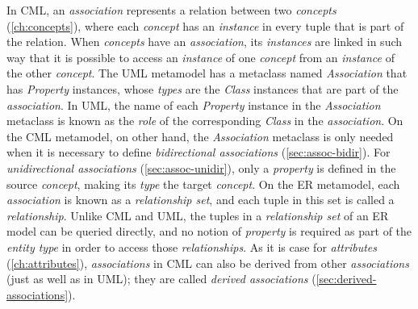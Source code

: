 \begin{definition}
In CML,
an \emph{association} represents a relation between two \emph{concepts} (\ref{ch:concepts}),
where each \emph{concept} has an \emph{instance} in every tuple that is part of the relation.
When \emph{concepts} have an \emph{association},
its \emph{instances} are linked in such way that
it is possible to access an \emph{instance} of one \emph{concept}
from an \emph{instance} of the other \emph{concept}.
The UML \cite{uml} metamodel has a metaclass named \emph{Association} that has \emph{Property} instances,
whose \emph{types} are the \emph{Class} instances that are part of the \emph{association}.
In UML, the name of each \emph{Property} instance in the \emph{Association} metaclass
is known as the \emph{role} of the corresponding \emph{Class} in the \emph{association}.
On the CML metamodel, on other hand,
the \emph{Association} metaclass is only needed
when it is necessary to define \emph{bidirectional associations} (\ref{sec:assoc-bidir}).
For \emph{unidirectional associations} (\ref{sec:assoc-unidir}),
only a \emph{property} is defined in the source \emph{concept},
making its \emph{type} the target \emph{concept}.
On the ER \cite{er} metamodel,
each \emph{association} is known as a \emph{relationship set},
and each tuple in this set is called a \emph{relationship}.
Unlike CML and UML,
the tuples in a \emph{relationship set} of an ER model
can be queried directly,
and no notion of \emph{property} is required as part of the \emph{entity type}
in order to access those \emph{relationships}.
As it is case for \emph{attributes} (\ref{ch:attributes}),
\emph{associations} in CML can also be derived from other \emph{associations}
(just as well as in UML);
they are called \emph{derived associations} (\ref{sec:derived-associations}).
\end{definition}

